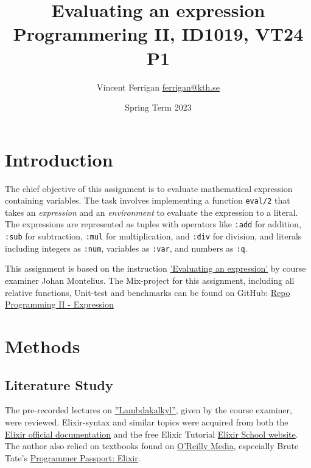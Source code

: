 \documentclass[a4paper,11pt]{article}
\begin{document}
\title{
    Evaluating an expression
\\\small{Programmering II, ID1019, VT24 P1}
}
\author{Vincent Ferrigan \href{mailto:ferrigan@kth.se}{ferrigan@kth.se}}

\date{Spring Term 2023}

\maketitle

\section*{Introduction}
\label{sec:introduction}
The chief objective of this assignment is to evaluate mathematical expression containing variables.
The task involves implementing a function
\texttt{eval/2} that takes an \emph{expression} and an \emph{environment} to evaluate the expression to a
literal.
The expressions are represented as tuples with operators like
\texttt{:add} for addition,
\texttt{:sub} for subtraction,
\texttt{:mul} for multiplication, and
\texttt{:div} for division,
and literals including integers as
\texttt{:num}, variables as
\texttt{:var}, and numbers as
\texttt{:q}.

This assignment is based on the instruction
\href{https://people.kth.se/~johanmon/courses/id1019/seminars/expression/expression.pdf}{'Evaluating an expression'}
by course examiner Johan Montelius.
The Mix-project for this assignment, including all relative functions, Unit-test and benchmarks can be found on GitHub:
\href{https://github.com/VincentFerrigan/kth-id1019-programming-ii/tree/main/tasks/3/expression}{Repo Programming II - Expression}%
\section*{Methods}
\label{sec:methods}
\subsection*{Literature Study}
\label{subsec:literaturestudy}
The pre-recorded lectures on
\href{https://canvas.kth.se/courses/44911/assignments/syllabus}{''Lambdakalkyl''},
given by the course examiner, were reviewed.
Elixir-syntax and similar topics were acquired
from both the
\href{https://elixir-lang.org/docs.html}{Elixir official documentation}
and the free Elixir Tutorial
\href{https://elixirschool.com/en}{Elixir School
website}.
The author also relied on textbooks found on
\href{https://learning.oreilly.com}{O'Reilly Media},
especially Brute Tate's
\href{https://learning.oreilly.com/library/view/programmer-passport-elixir/9781680509649/}{Programmer Passport: Elixir}.
\end{document}
